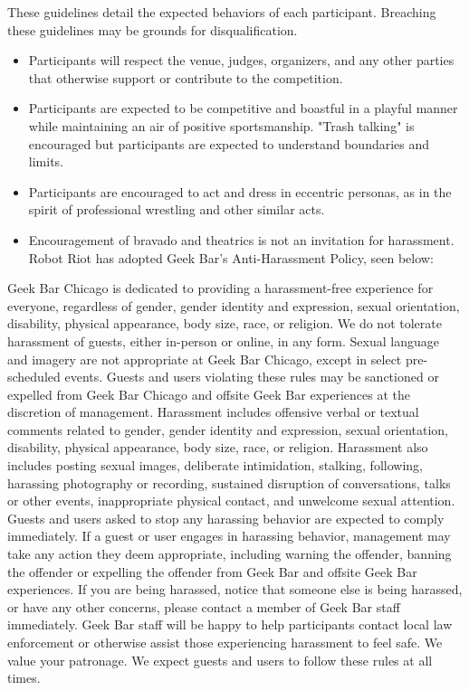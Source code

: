 \documentclass{article}
\begin{document}
	These guidelines detail the expected behaviors of each participant. Breaching these guidelines may be grounds for disqualification.

	
	\begin{itemize}
  			\item Participants will respect the venue, judges, organizers, and any other parties that otherwise support or contribute to the competition.
 			\item Participants are expected to be competitive and boastful in a playful manner while maintaining an air of positive sportsmanship. "Trash talking" is encouraged but participants are expected to understand boundaries and limits.
  			\item Participants are encouraged to act and dress in eccentric personas, as in the spirit of professional wrestling and other similar acts.
 			\item Encouragement of bravado and theatrics is not an invitation for harassment. Robot Riot has adopted Geek Bar's Anti-Harassment Policy, seen below:
  	
		\end{itemize}
		
		Geek Bar Chicago is dedicated to providing a harassment-free experience for everyone, regardless of
gender, gender identity and expression, sexual orientation, disability, physical appearance, body size,
race, or religion. We do not tolerate harassment of guests, either in-person or online, in any form. Sexual
language and imagery are not appropriate at Geek Bar Chicago, except in select pre-scheduled events.
Guests and users violating these rules may be sanctioned or expelled from Geek Bar Chicago and offsite
Geek Bar experiences at the discretion of management. Harassment includes offensive verbal or textual
comments related to gender, gender identity and expression, sexual orientation, disability, physical
appearance, body size, race, or religion. Harassment also includes posting sexual images, deliberate
intimidation, stalking, following, harassing photography or recording, sustained disruption of
conversations, talks or other events, inappropriate physical contact, and unwelcome sexual attention.
Guests and users asked to stop any harassing behavior are expected to comply immediately. If a guest or
user engages in harassing behavior, management may take any action they deem appropriate, including
warning the offender, banning the offender or expelling the offender from Geek Bar and offsite Geek Bar
experiences. If you are being harassed, notice that someone else is being harassed, or have any other
concerns, please contact a member of Geek Bar staff immediately. Geek Bar staff will be happy to help
participants contact local law enforcement or otherwise assist those experiencing harassment to feel
safe. We value your patronage. We expect guests and users to follow these rules at all times.
		
\end{document}
